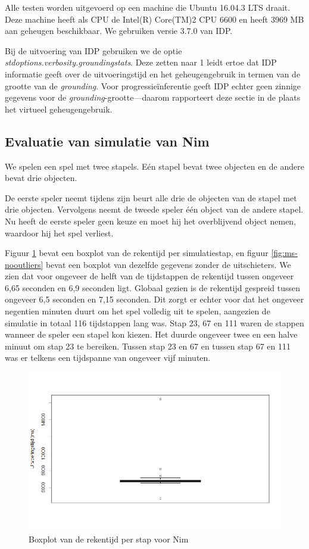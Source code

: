 Alle testen worden uitgevoerd op een machine die Ubuntu 16.04.3 LTS draait. Deze machine heeft als CPU de Intel(R) Core(TM)2 CPU 6600 en heeft 3969 MB aan geheugen beschikbaar. We gebruiken versie 3.7.0 van IDP.

Bij de uitvoering van IDP gebruiken we de optie \textit{stdoptions.verbosity.groundingstats}. Deze zetten naar 1 leidt ertoe dat IDP informatie geeft over de uitvoeringstijd en het geheugengebruik in termen van de grootte van de \textit{grounding}\cite{DeCatBroes2014PLaa}. Voor progressie\"inferentie geeft IDP echter geen zinnige gegevens voor de \textit{grounding}-grootte---daarom rapporteert deze sectie in de plaats het virtueel geheugengebruik.

\subsection{Evaluatie van simulatie van Nim}

We spelen een spel met twee stapels. E\'en stapel bevat twee objecten en de andere bevat drie objecten.

De eerste speler neemt tijdens zijn beurt alle drie de objecten van de stapel met drie objecten. Vervolgens neemt de tweede speler \'e\'en object van de andere stapel. Nu heeft de eerste speler geen keuze en moet hij het overblijvend object nemen, waardoor hij het spel verliest.

Figuur \ref{fig:ms} bevat een boxplot van de rekentijd per simulatiestap, en figuur \ref{fig:ms-nooutliers} bevat een boxplot van dezelfde gegevens zonder de uitschieters. We zien dat voor ongeveer de helft van de tijdstappen de rekentijd tussen ongeveer 6,65 seconden en 6,9 seconden ligt. Globaal gezien is de rekentijd gespreid tussen ongeveer 6,5 seconden en 7,15 seconden. Dit zorgt er echter voor dat het ongeveer negentien minuten duurt om het spel volledig uit te spelen, aangezien de simulatie in totaal 116 tijdstappen lang was. Stap 23, 67 en 111 waren de stappen wanneer de speler een stapel kon kiezen. Het duurde ongeveer twee en een halve minuut om stap 23 te bereiken. Tussen stap 23 en 67 en tussen stap 67 en 111 was er telkens een tijdspanne van ongeveer vijf minuten.

\begin{figure}
	\includegraphics[width=1.05\textwidth]{chap-evaluatie/boxplot.png}
	\caption{Boxplot van de rekentijd per stap voor Nim}
	\label{fig:ms}
\end{figure}

